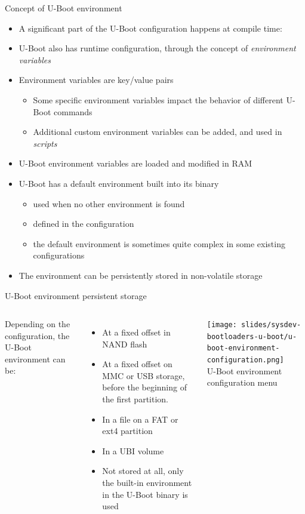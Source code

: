 \begin{frame}{Concept of U-Boot environment}
  \begin{itemize}
  \item A significant part of the U-Boot configuration happens at
    compile time: 
  \item U-Boot also has runtime configuration, through the concept of
    {\em environment variables}
  \item Environment variables are key/value pairs
    \begin{itemize}
    \item Some specific environment variables impact the behavior of
      different U-Boot commands
    \item Additional custom environment variables can be added, and
      used in {\em scripts}
    \end{itemize}
  \item U-Boot environment variables are loaded and modified in RAM
  \item U-Boot has a default environment built into its binary
    \begin{itemize}
    \item used when no other environment is found
    \item defined in the configuration
    \item the default environment is sometimes quite complex in some
      existing configurations
    \end{itemize}
  \item The environment can be persistently stored in non-volatile
    storage
  \end{itemize}
\end{frame}

\begin{frame}{U-Boot environment persistent storage}
  \begin{columns}
    Depending on the configuration, the U-Boot environment can be:
    \begin{itemize}
    \item At a fixed offset in NAND flash
    \item At a fixed offset on MMC or USB storage, before the
      beginning of the first partition.
    \item In a file on a FAT or ext4 partition
    \item In a UBI volume
    \item Not stored at all, only the built-in environment in the
      U-Boot binary is used
    \end{itemize}
    \texttt{[image: slides/sysdev-bootloaders-u-boot/u-boot-environment-configuration.png]}\\
    \vspace{0.3cm}
    \tiny U-Boot environment configuration menu
  \end{columns}
\end{frame}

